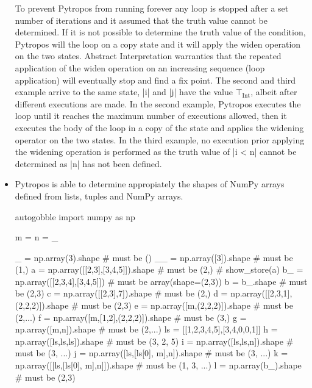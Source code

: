 \begin{itemize}
  To prevent Pytropos from running forever any loop is stopped after a set number of
  iterations and it assumed that the truth value cannot be determined.  If it is not
  possible to determine the truth value of the condition, Pytropos will the loop on a copy
  state and it will apply the widen operation on the two states. Abstract Interpretation
  warranties that the repeated application of the widen operation on an increasing
  sequence (loop application) will eventually stop and find a fix point. The second and
  third example arrive to the same state, \pycode|i| and \pycode|j| have the value
  $\top_{\text{Int}}$, albeit after different executions are made. In the second example,
  Pytropos executes the loop until it reaches the maximum number of executions allowed,
  then it executes the body of the loop in a copy of the state and applies the widening
  operator on the two states. In the third example, no execution prior applying the
  widening operation is performed as the truth value of \pycode|i < n| cannot be
  determined as \pycode|n| has not been defined.

\item Pytropos is able to determine appropiately the shapes of NumPy arrays defined from
  lists, tuples and NumPy arrays.

  \begin{pythoncode*}{autogobble}
    import numpy as np

    m = n = _

    _ = np.array(3).shape                   # must be ()
    __ = np.array([3]).shape                # must be (1,)
    a = np.array([[2,3],[3,4,5]]).shape     # must be (2,)
    # show_store(a)
    b_ = np.array([[2,3,4],[3,4,5]])        # must be array(shape=(2,3))
    b = b_.shape                            # must be (2,3)
    c = np.array([[2,3],7]).shape           # must be (2,)
    d = np.array([[2,3,1],(2,2,2)]).shape   # must be (2,3)
    e = np.array([m,(2,2,2)]).shape         # must be (2,...)
    f = np.array([m,[1,2],(2,2,2)]).shape   # must be (3,)
    g = np.array([m,n]).shape               # must be (2,...)
    ls = [[1,2,3,4,5],[3,4,0,0,1]]
    h = np.array([ls,ls,ls]).shape          # must be (3, 2, 5)
    i = np.array([ls,ls,n]).shape           # must be (3, ...)
    j = np.array([ls,[ls[0], m],n]).shape   # must be (3, ...)
    k = np.array([[ls,[ls[0], m],n]]).shape # must be (1, 3, ...)
    l = np.array(b_).shape                  # must be (2,3)
  \end{pythoncode*}


\end{itemize}
